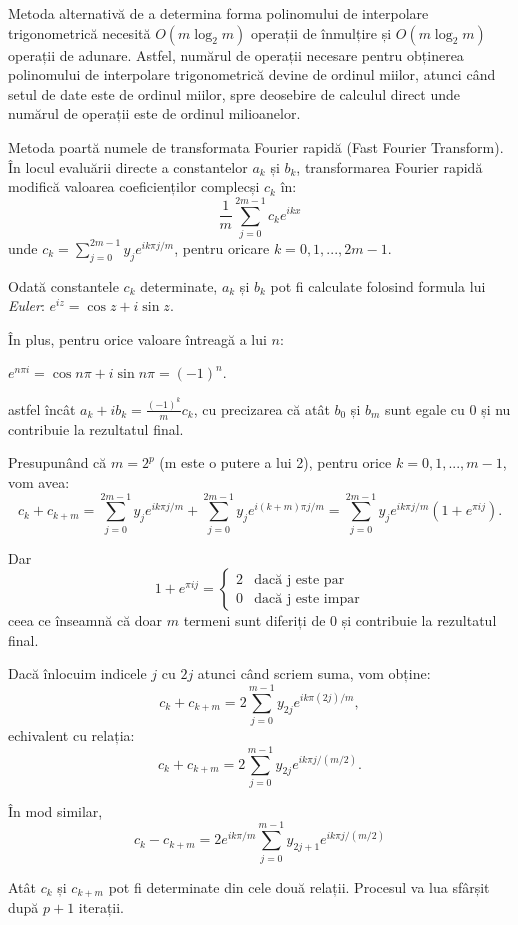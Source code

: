 \documentclass{exam}
\begin{document}
Metoda alternativă de a determina forma polinomului de interpolare trigonometrică necesită  $O(m\log_2 m)$ operații de înmulțire și $O(m\log_2 m)$ operații de adunare. Astfel, numărul de operații necesare pentru obținerea polinomului de interpolare trigonometrică devine de ordinul miilor, atunci când setul de date este de ordinul miilor, spre deosebire de calculul direct unde numărul de operații este de ordinul milioanelor.

Metoda poartă numele de transformata Fourier rapidă (Fast Fourier Transform). În locul evaluării directe a constantelor $a_k$ și $b_k$, transformarea Fourier rapidă modifică valoarea coeficienților complecși $c_k$ în:
$$\frac{1}{m}\sum_{j=0}^{2m-1} c_ke^{ikx}$$
unde $c_k = \sum_{j=0}^{2m-1} y_je^{ik\pi j/m}$, pentru oricare $k = 0, 1, ..., 2m-1$.

Odată constantele $c_k$ determinate, $a_k$ și $b_k$ pot fi calculate folosind formula lui \textit{Euler}: $e^{iz} = \cos z + i\sin z.$

În plus, pentru orice valoare întreagă a lui $n$:
\begin{center}
	$e^{n\pi i} = \cos n\pi + i\sin n\pi = (-1)^{n}.$
\end{center}
astfel încât $a_k + ib_k = \frac{(-1)^{k}}{m}c_k$, cu precizarea că atât $b_0$ și $b_m$ sunt egale cu $0$ și nu contribuie la rezultatul final.

Presupunând că $m = 2^p$ (m este o putere a lui 2), pentru orice $k = 0, 1, ..., m-1$, vom avea:
$$c_k + c_{k+m}= \sum_{j=0}^{2m-1} y_je^{ik\pi j/m} + \sum_{j=0}^{2m-1} y_je^{i(k+m)\pi j/m} = \sum_{j=0}^{2m-1} y_je^{ik\pi j/m}(1 + e^{\pi ij}).$$

Dar
$$1 + e^{\pi ij} =
	\left\{
	\begin{array}{ll}
		2 & \mbox{dacă j este par}   \\
		0 & \mbox{dacă j este impar}
	\end{array}
	\right.$$
ceea ce înseamnă că doar $m$ termeni sunt diferiți de $0$ și contribuie la rezultatul final.

Dacă înlocuim indicele $j$ cu $2j$ atunci când scriem suma, vom obține:
$$c_k + c_{k+m}= 2\sum_{j=0}^{m-1} y_{2j}e^{ik\pi (2j)/m},$$
echivalent cu relația:
$$c_k + c_{k+m}= 2\sum_{j=0}^{m-1} y_{2j}e^{ik\pi j/(m/2)}.$$

În mod similar,
$$c_k - c_{k+m}= 2e^{ik\pi /m}\sum_{j=0}^{m-1} y_{2j+1}e^{ik\pi j/(m/2)}$$

Atât $c_k$ și $c_{k+m}$ pot fi determinate din cele două relații. Procesul va lua sfârșit după $p + 1$ iterații.
\end{document}
